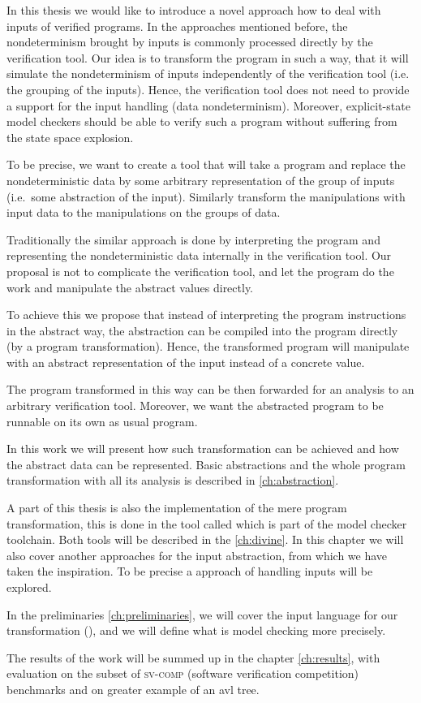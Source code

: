 In this thesis we would like to introduce a novel approach how to deal with
inputs of verified programs. In the approaches mentioned before, the
nondeterminism brought by inputs is commonly processed directly by the verification
tool. Our idea is to transform the program in such a way, that it will simulate
the nondeterminism of inputs independently of the verification tool (i.e. the
grouping of the inputs). Hence, the verification tool does not need to
provide a support for the input handling (data nondeterminism). Moreover,
explicit-state model checkers should be able to verify such a program without
suffering from the state space explosion.

To be precise, we want to create a tool that will take a program and replace the
nondeterministic data by some arbitrary representation of the group of inputs
(i.e.~some abstraction of the input).
Similarly transform the manipulations with input data to the manipulations
on the groups of data.

Traditionally the similar approach is done by interpreting the program and
representing the nondeterministic data internally in the verification tool.
Our proposal is not to complicate the verification tool, and let the program do
the work and manipulate the abstract values directly.

To achieve this we propose that instead of interpreting the program
instructions in the abstract way, the abstraction can be compiled into the program
directly (by a program transformation). Hence, the transformed program will
manipulate with an abstract representation of the input instead of a concrete value.

The program transformed in this way can be then forwarded for an analysis to
an arbitrary verification tool. Moreover, we want the abstracted program to be
runnable on its own as usual program.

In this work we will present how such transformation can be achieved and how
the abstract data can be represented. Basic abstractions and the whole program
transformation with all its analysis is described in \autoref{ch:abstraction}.

A part of this thesis is also the implementation of the mere program
transformation, this is done in the tool called \LART which is part of the
\DIVINE model checker toolchain. Both tools will be described in the
\autoref{ch:divine}. In this chapter we will also cover another approaches for the
input abstraction, from which we have taken the inspiration. To be precise a
\SymDIVINE approach of handling inputs will be explored.

In the preliminaries \autoref{ch:preliminaries}, we will cover the input
language for our transformation (\LLVM), and we will define what is model
checking more precisely.

The results of the work will be summed up in the chapter \autoref{ch:results},
with evaluation on the subset of \textsc{sv-comp} (software verification
competition) benchmarks and on greater example of an avl tree.

